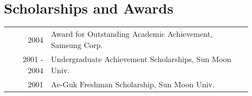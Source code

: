 \documentclass[a4paper,10pt]{article} %
\begin{document}

\section{Scholarships and Awards}

\begin{tabular}{rl}
	2004 & Award for Outstanding Academic Achievement, Samsung Corp.\\
	2001 - 2004 & Undergraduate Achievement Scholarships, Sun Moon
	Univ.\\
	2001 & Ae-Guk Freshman Scholarship, Sun Moon Univ.\\
\end{tabular}


%
%


\renewcommand\refname{Publications} %
\nocite{*} %
\end{document}
